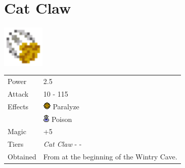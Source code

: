 \section{Cat Claw}
\label{weapon:cat_claw}

\includegraphics[height=2cm,keepaspectratio]{./resources/weapons/catclaw}

\begin{longtable}{ l p{9cm} }
	Power
	& 2.5
\\ %
	Attack
	& 10 - 115
\\ %
	Effects
	& \includegraphics[height=1em,keepaspectratio]{./resources/effects/paralyze}
	Paralyze \\
	& \includegraphics[height=1em,keepaspectratio]{./resources/effects/poison}
	Poison
\\ %
	Magic
	& +5
\\ %
	Tiers
	& \textit{Cat Claw} - \nameref{weapon:charm_claw} - \nameref{weapon:dragon_claw}
\\ %
	Obtained
	& From \nameref{char:phoebe} at the beginning of the Wintry Cave.
\end{longtable}
